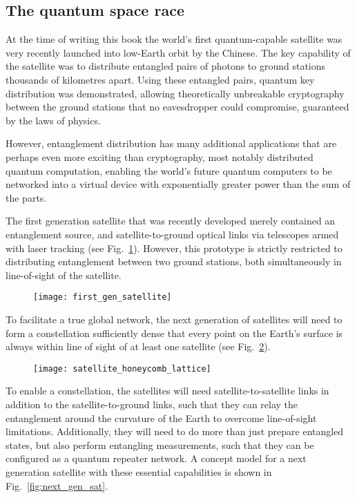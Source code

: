 %
%

\subsection{The quantum space race}\label{sec:quant_space_race_essay}

At the time of writing this book the world's first quantum-capable satellite was very recently launched into low-Earth orbit by the Chinese. The key capability of the satellite was to distribute entangled pairs of photons to ground stations thousands of kilometres apart. Using these entangled pairs, quantum key distribution was demonstrated, allowing theoretically unbreakable cryptography between the ground stations that no eavesdropper could compromise, guaranteed by the laws of physics.

However, entanglement distribution has many additional applications that are perhaps even more exciting than cryptography, most notably distributed quantum computation, enabling the world's future quantum computers to be networked into a virtual device with exponentially greater power than the sum of the parts.

The first generation satellite that was recently developed merely contained an entanglement source, and satellite-to-ground optical links via telescopes armed with laser tracking (see Fig.~\ref{fig:first_gen_sat}). However, this prototype is strictly restricted to distributing entanglement between two ground stations, both simultaneously in line-of-sight of the satellite.

\begin{figure}[!htb]
\texttt{[image: first\_gen\_satellite]}
\caption{}\label{fig:first_gen_sat}	
\end{figure}

To facilitate a true global network, the next generation of satellites will need to form a constellation sufficiently dense that every point on the Earth's surface is always within line of sight of at least one satellite (see Fig.~\ref{fig:sat_honeycomb}).

\begin{figure}[!htb]
\texttt{[image: satellite\_honeycomb\_lattice]}
\caption{}\label{fig:sat_honeycomb}	
\end{figure}

To enable a constellation, the satellites will need satellite-to-satellite links in addition to the satellite-to-ground links, such that they can relay the entanglement around the curvature of the Earth to overcome line-of-sight limitations. Additionally, they will need to do more than just prepare entangled states, but also perform entangling measurements, such that they can be configured as a quantum repeater network. A concept model for a next generation satellite with these essential capabilities is shown in Fig.~\ref{fig:next_gen_sat}.


